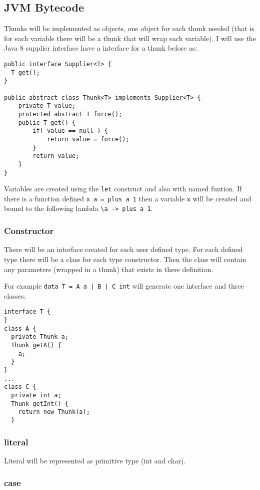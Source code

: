 \documentclass[12pt,a4paper,twoside]{article}
\begin{document}
\subsection{JVM Bytecode}

Thunks will be implemented as objects, one object for each thunk needed 
(that is for each variable there will be a thunk that will wrap each variable).
I will use the Java 8 supplier interface have a interface for a thunk before as:


\begin{verbatim}
public interface Supplier<T> {
  T get();
}

public abstract class Thunk<T> implements Supplier<T> {
    private T value;
    protected abstract T force();
    public T get() {
        if( value == null ) {
            return value = force();
        }
        return value;
    }
}
\end{verbatim}

Variables are created using the \texttt{let} construct and also with named funtion. If there is a function defined \texttt{x a = plus a 1} then a
variable \texttt{x} will be created and bound to the following lambda
\texttt{\textbackslash a -> plus a 1}.

\subsubsection{Constructor}

There will be an interface created for each user defined type. 
For each defined type there will be a class for each type constructor. 
Then the class will contain any parameters (wrapped in a thunk) that exists in there definition.

For example \texttt{data T = A a | B | C int} will generate one interface and three classes:

\begin{verbatim}
interface T {
}
class A {
  private Thunk a;
  Thunk getA() {
    a;
  }
}
...
class C {
  private int a;
  Thunk getInt() {
    return new Thunk(a);
  }
\end{verbatim}

\subsubsection{literal}

Literal will be represented as primitive type (int and char).

\subsubsection{case}
\end{document}
